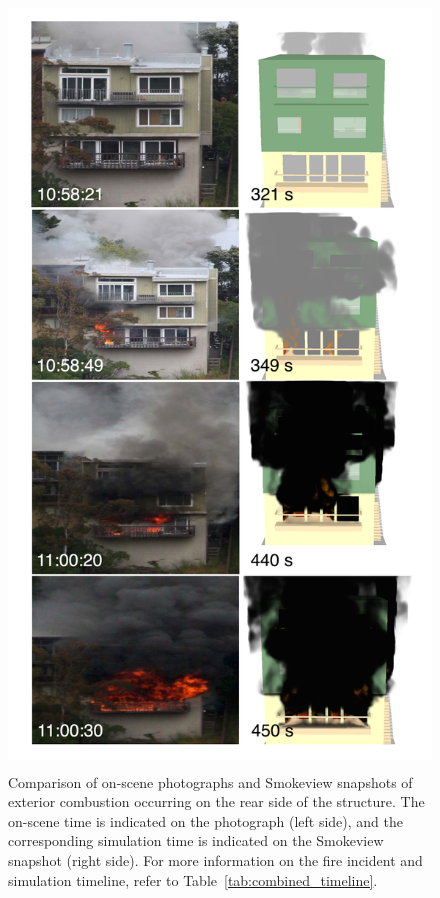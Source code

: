 \documentclass[12pt,oneside]{book}
\begin{document}
\begin{figure}[!ht]
\includegraphics[height=8.0in]{../Figures/Timeline_Comparison}
\caption[Snapshots of exterior combustion occurring on the rear side of the structure.]
{Comparison of on-scene photographs and Smokeview snapshots of exterior combustion occurring on the rear side of the structure. The on-scene time is indicated on the photograph (left side), and the corresponding simulation time is indicated on the Smokeview snapshot (right side). For more information on the fire incident and simulation timeline, refer to Table~\ref{tab:combined_timeline}.}
\label{fig:timeline_comparison_rear}
\end{figure}
\end{document}
